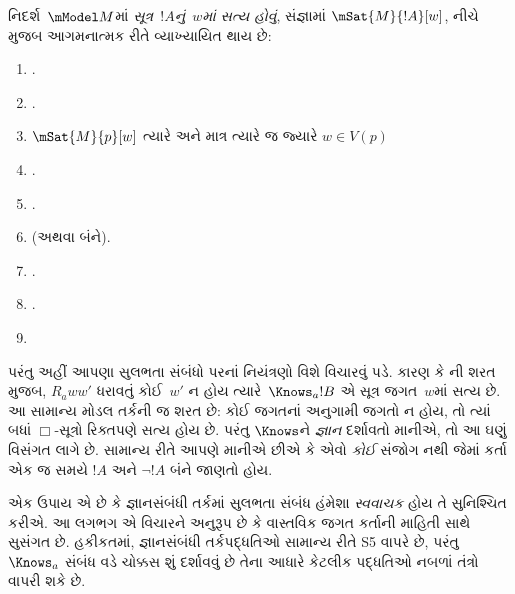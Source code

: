 \begin{defn}
  નિદર્શ~$\mModel M$માં \emph{સૂત્ર~$!A$નું~$w$માં સત્ય હોવું},
  સંજ્ઞામાં $\mSat{M}{!A}[w]$, નીચે મુજબ આગમનાત્મક રીતે
  વ્યાખ્યાયિત થાય છે:
  \begin{enumerate}
  \item {}.
  \item {}.
  \item $\mSat{M}{p}[w]$ ત્યારે અને માત્ર ત્યારે જ જ્યારે $w \in V(p)$
  \item {}.
  \item {}.
  \item {} (અથવા બંને).
  \item {}.
  \item {}.
  \item{}
  \end{enumerate} 
\end{defn}

પરંતુ અહીં આપણા સુલભતા સંબંધો પરનાં નિયંત્રણો વિશે વિચારવું પડે.
કારણ કે ની શરત મુજબ, $R_a ww'$
ધરાવતું કોઈ~$w'$ ન હોય ત્યારે~$\Knows_a !B$ એ સૂત્ર
જગત~$w$માં સત્ય છે. આ સામાન્ય મોડલ તર્કની જ શરત છે: કોઈ
જગતનાં અનુગામી જગતો ન હોય, તો ત્યાં બધાં $\Box$-સૂત્રો
રિક્તપણે સત્ય હોય છે. પરંતુ $\Knows$ને \emph{જ્ઞાન} દર્શાવતો
માનીએ, તો આ ઘણું વિસંગત લાગે છે. સામાન્ય રીતે આપણે માનીએ છીએ
કે એવો \emph{કોઈ} સંજોગ નથી જેમાં કર્તા એક જ સમયે $!A$ અને
$\lnot !A$ બંને જાણતો હોય.

એક ઉપાય એ છે કે જ્ઞાનસંબંધી તર્કમાં સુલભતા સંબંધ હંમેશા
\emph{સ્વવાચક} હોય તે સુનિશ્ચિત કરીએ. આ લગભગ એ વિચારને અનુરૂપ
છે કે વાસ્તવિક જગત કર્તાની માહિતી સાથે સુસંગત છે. હકીકતમાં,
જ્ઞાનસંબંધી તર્કપદ્ધતિઓ સામાન્ય રીતે S5 વાપરે છે, પરંતુ
$\Knows_a$ સંબંધ વડે ચોક્કસ શું દર્શાવવું છે તેના આધારે
કેટલીક પદ્ધતિઓ નબળાં તંત્રો વાપરી શકે છે.

